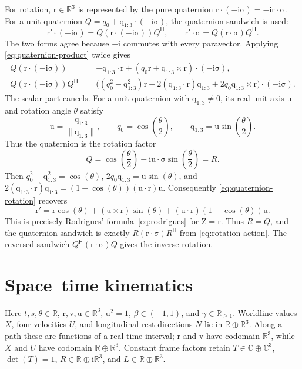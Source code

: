 \documentclass[11pt]{article}
\newcommand{\pv}[1]{{#1}}
\newcommand{\vstyle}[1]{{\bm{\mathrm{#1}}}}
\newcommand{\pL}{\pv{L}}
\newcommand{\pN}{\pv{N}}
\newcommand{\pQ}{\pv{Q}}
\newcommand{\pR}{\pv{R}}
\newcommand{\pT}{\pv{T}}
\newcommand{\pU}{\pv{U}}
\newcommand{\pX}{\pv{X}}
\numberwithin{equation}{section}
\newcommand{\R}{\mathbb{R}}
\newcommand{\C}{\mathbb{C}}
\newcommand{\ii}{\mathrm{i}}
\newcommand{\dotprod}{\cdot}
\newcommand{\bsig}{\vstyle{\sigma}}
\newcommand{\bZ}{\vstyle{Z}}
\newcommand{\br}{\vstyle{r}}
\newcommand{\bv}{\vstyle{v}}
\newcommand{\bu}{\vstyle{u}}
\begin{document}
For rotation, $\br\in\R^3$ is represented by the pure quaternion
$\br\dotprod(-\ii\bsig)=-\ii\br\dotprod\bsig$.
For a unit quaternion $\pQ=q_0+\vstyle{q}_{1:3}\dotprod(-\ii\bsig)$, the quaternion sandwich is used:
\begin{equation}
 \br'\dotprod(-\ii\bsig)=\pQ(\br\dotprod(-\ii\bsig))\pQ^{\mathsf H},
 \qquad
 \br'\dotprod\bsig=\pQ(\br\dotprod\bsig)\pQ^{\mathsf H}.
 \label{eq:quaternion-rotation}
\end{equation}
The two forms agree because $-\ii$ commutes with every paravector.
Applying \eqref{eq:quaternion-product} twice gives
\begin{align*}
 \pQ(\br\dotprod(-\ii\bsig))
 &=-\vstyle{q}_{1:3}\dotprod\br+(q_0\br+\vstyle{q}_{1:3}\times\br)\dotprod(-\ii\bsig),\\
 \pQ(\br\dotprod(-\ii\bsig))\pQ^{\mathsf H}
 &=\bigl((q_0^2-\vstyle{q}_{1:3}^2)\br+2(\vstyle{q}_{1:3}\dotprod\br)\vstyle{q}_{1:3}
          +2q_0\vstyle{q}_{1:3}\times\br\bigr)\dotprod(-\ii\bsig).
\end{align*}
The scalar part cancels. For a unit quaternion with $\vstyle{q}_{1:3}\ne0$, its
real unit axis $\bu$ and rotation angle $\theta$ satisfy
\[
 \bu=\frac{\vstyle{q}_{1:3}}{\lVert\vstyle{q}_{1:3}\rVert},\qquad
 q_0=\cos\left(\frac\theta2\right),\qquad \vstyle{q}_{1:3}=\bu\sin\left(\frac\theta2\right).
\]
Thus the quaternion is the rotation factor
\[
 \pQ=\cos\left(\frac\theta2\right)-\ii\bu\dotprod\bsig\sin\left(\frac\theta2\right)=\pR.
\]
Then $q_0^2-\vstyle{q}_{1:3}^2=\cos(\theta)$,
$2q_0\vstyle{q}_{1:3}=\bu\sin(\theta)$, and
$2(\vstyle{q}_{1:3}\dotprod\br)\vstyle{q}_{1:3}=(1-\cos(\theta))(\bu\dotprod\br)\bu$.
Consequently \eqref{eq:quaternion-rotation} recovers
\[
 \boxed{\br'=\br\cos(\theta)+(\bu\times\br)\sin(\theta)
       +(\bu\dotprod\br)(1-\cos(\theta))\bu.}
\]
This is precisely Rodrigues' formula~\eqref{eq:rodrigues} for
$\bZ=\br$.  Thus $\pR=\pQ$, and the quaternion sandwich is exactly
$\pR(\br\dotprod\bsig)\pR^{\mathsf H}$ from \eqref{eq:rotation-action}.
The reversed sandwich $\pQ^{\mathsf H}(\br\dotprod\bsig)\pQ$ gives the inverse rotation.

\section{Space--time kinematics}
\label{sec:kinematics}

Here $t,s,\theta\in\R$, $\br,\bv,\bu\in\R^3$, $\bu^2=1$,
$\beta\in(-1,1)$, and $\gamma\in\R_{\ge1}$.
Worldline values $\pX$, four-velocities $\pU$, and longitudinal rest
directions $\pN$ lie in $\R\oplus\R^3$.
Along a path these are functions of a real time interval; $\br$ and $\bv$
have codomain $\R^3$, while $\pX$ and $\pU$ have codomain $\R\oplus\R^3$.
Constant frame factors retain $\pT\in\C\oplus\C^3$, $\det(\pT)=1$,
$\pR\in\R\oplus\ii\R^3$, and $\pL\in\R\oplus\R^3$.
\end{document}
